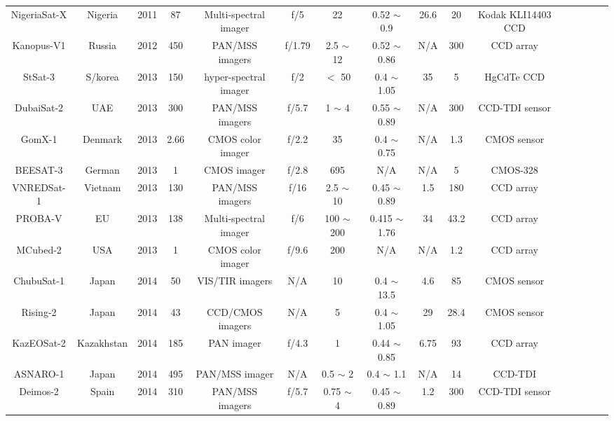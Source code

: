 \documentclass[final,5p,times,twocolumn,authoryear]{elsarticle}
\begin{document}
\begin{table}
{\begin{tabular}{c c c c c c c c c c c c c c c c}
		    NigeriaSat-X & Nigeria & 2011 & 87 & Multi-spectral imager &  f/5 & 22 & 0.52 $\sim$ 0.9 &  26.6 & 20 &   Kodak KLI14403 CCD & \citep{eoportal}\\	    
		    Kanopus-V1 & Russia & 2012 & 450 & PAN/MSS imagers & f/1.79 & 2.5 $\sim$ 12 & 0.52 $\sim$ 0.86 & N/A & 300 &CCD array & \citep{eoportal}\\	
		    StSat-3 & S/korea & 2013 & 150 & hyper-spectral imager & f/2 & $<$ 50 & 0.4 $\sim$ 1.05 & 35 & 5 & HgCdTe CCD & \citep{lee2007compact}\\	
		    DubaiSat-2 & UAE & 2013 & 300 & PAN/MSS imagers & f/5.7 & 1 $\sim$ 4 & 0.55 $\sim$ 0.89 & N/A & 300 &  CCD-TDI sensor & \citep{bushahab2014cal}\\
		    GomX-1 & Denmark & 2013 & 2.66 & CMOS color imager & f/2.2 & 35 & 0.4 $\sim$ 0.75 &  N/A &  1.3 & CMOS sensor & \citep{gomspace2023}\\		 
		    BEESAT-3 & German & 2013 & 1 & CMOS imager & f/2.8 & 695 & N/A &  N/A & 5 & CMOS-328 & \citep{eoportal}\\		    
		    VNREDSat-1 & Vietnam & 2013 & 130 & PAN/MSS imagers & f/16 & 2.5 $\sim$ 10 & 0.45 $\sim$ 0.89 &1.5 & 180 & CCD array & \citep{eoportal}\\	
		    PROBA-V & EU & 2013 & 138 & Multi-spectral imager & f/6 & 100 $\sim$ 200 & 0.415 $\sim$ 1.76 &  34 & 43.2 &  CCD array & \citep{eoportal}\\		    
		    MCubed-2 & USA & 2013 & 1 & CMOS color imager & f/9.6 & 200 & N/A & N/A & 1.2 &  CCD array & \citep{bekker2010cubesat}\\		   
		    ChubuSat-1 & Japan & 2014 & 50 & VIS/TIR imagers & N/A & 10 & 0.4 $\sim$ 13.5 &  4.6 & 85 &  CMOS sensor & \citep{ Narusawa2012DEVELOPMENTOC}\\		
		    Rising-2 & Japan & 2014 & 43 & CCD/CMOS imagers & N/A & 5 & 0.4 $\sim$ 1.05 &  29 & 28.4 &CMOS sensor & \citep{sakamoto2010development}\\		    
		    KazEOSat-2 & Kazakhstan & 2014 & 185 & PAN imager & f/4.3 & 1 & 0.44 $\sim$ 0.85 & 6.75 & 93 &  CCD array & \citep{kurczynski2016possibilities} \\		 
		    ASNARO-1 & Japan & 2014 & 495 & PAN/MSS imager & N/A & 0.5 $\sim$ 2 & 0.4 $\sim$ 1.1 & N/A & 14 &  CCD-TDI & \citep{eoportal}\\		
		    Deimos-2 & Spain & 2014 & 310 & PAN/MSS imagers & f/5.7 & 0.75 $\sim$ 4 & 0.45 $\sim$ 0.89 &  1.2 & 300 &  CCD-TDI sensor & \cite{ pirondini2014deimos}\\		

\end{tabular}}
\end{table}
\end{document}
